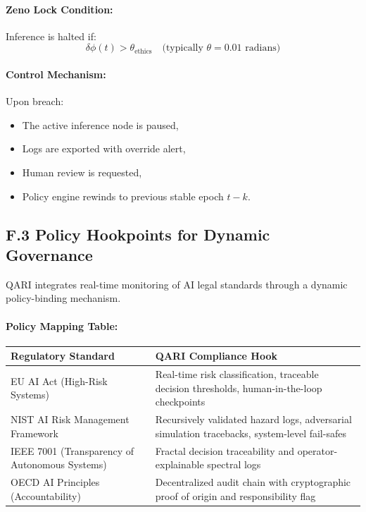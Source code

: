 \documentclass[12pt]{article}
\begin{document}
\begin{itemize}
\paragraph{Zeno Lock Condition:}
Inference is halted if:
\[
\delta\phi(t) > \theta_{\text{ethics}} \quad \text{(typically } \theta = 0.01 \text{ radians)}
\]

\paragraph{Control Mechanism:}
Upon breach:
\begin{itemize}
    \item The active inference node is paused,
    \item Logs are exported with override alert,
    \item Human review is requested,
    \item Policy engine rewinds to previous stable epoch \( t-k \).
\end{itemize}

\subsection*{F.3 Policy Hookpoints for Dynamic Governance}

QARI integrates real-time monitoring of AI legal standards through a dynamic policy-binding mechanism.

\paragraph{Policy Mapping Table:}

\begin{tabular}{|p{4cm}|p{9cm}|}
\hline
\textbf{Regulatory Standard} & \textbf{QARI Compliance Hook} \\
\hline
EU AI Act (High-Risk Systems) & Real-time risk classification, traceable decision thresholds, human-in-the-loop checkpoints \\
\hline
NIST AI Risk Management Framework & Recursively validated hazard logs, adversarial simulation tracebacks, system-level fail-safes \\
\hline
IEEE 7001 (Transparency of Autonomous Systems) & Fractal decision traceability and operator-explainable spectral logs \\
\hline
OECD AI Principles (Accountability) & Decentralized audit chain with cryptographic proof of origin and responsibility flag \\
\hline
\end{tabular}


\end{itemize}
\end{document}
